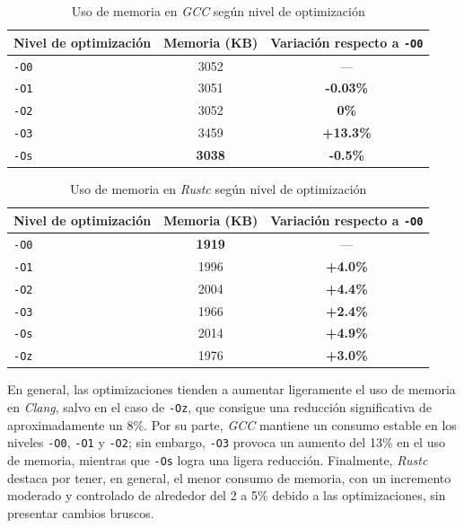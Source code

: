 \begin{table}[H]
\centering
\footnotesize
\begin{tabular}{|l|c|c|}
\hline
\textbf{Nivel de optimización} & \textbf{Memoria (KB)} & \textbf{Variación respecto a \texttt{-O0}} \\
\hline
\texttt{-O0} & 3052 & — \\
\texttt{-O1} & 3051 & \textbf{-0.03\%}\\
\texttt{-O2} & 3052 & \textbf{0\%} \\
\texttt{-O3} & 3459 & \textbf{+13.3\%}\\
\texttt{-Os} & \textbf{3038} & \textbf{-0.5\%}\\
\hline
\end{tabular}
\caption{Uso de memoria en \emph{GCC} según nivel de optimización}
\label{tab:memoria_gcc}
\end{table}


\begin{table}[H]
\centering
\footnotesize
\begin{tabular}{|l|c|c|}
\hline
\textbf{Nivel de optimización} & \textbf{Memoria (KB)} & \textbf{Variación respecto a \texttt{-O0}} \\
\hline
\texttt{-O0} & \textbf{1919} & — \\
\texttt{-O1} & 1996 & \textbf{+4.0\%} \\
\texttt{-O2} & 2004 & \textbf{+4.4\%} \\
\texttt{-O3} & 1966 & \textbf{+2.4\%} \\
\texttt{-Os} & 2014 & \textbf{+4.9\%} \\
\texttt{-Oz} & 1976 & \textbf{+3.0\%} \\
\hline
\end{tabular}
\caption{Uso de memoria en \emph{Rustc} según nivel de optimización}
\label{tab:memoria_rustc}
\end{table}

En general, las optimizaciones tienden a aumentar ligeramente el uso de memoria en \emph{Clang}, salvo en el caso de \texttt{-Oz}, que consigue una reducción significativa de aproximadamente un 8\%. Por su parte, \emph{GCC} mantiene un consumo estable en los niveles \texttt{-O0}, \texttt{-O1} y \texttt{-O2}; sin embargo, \texttt{-O3} provoca un aumento del 13\% en el uso de memoria, mientras que \texttt{-Os} logra una ligera reducción. Finalmente, \emph{Rustc} destaca por tener, en general, el menor consumo de memoria, con un incremento moderado y controlado de alrededor del 2 a 5\% debido a las optimizaciones, sin presentar cambios bruscos.


